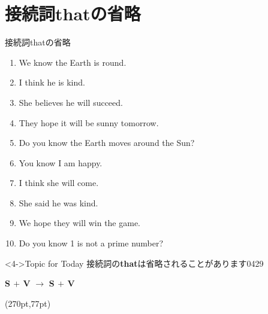 \documentclass[aspectratio=169,xcolor={dvipsnames,table}]{beamer}
\begin{document}
\section{接続詞thatの省略}
\begin{frame}[plain,t]{接続詞thatの省略}
 
\begin{enumerate}
 \item We know \only<1>{\textbf{that}} the Earth is round.
 \item I think  he is kind.
 \item She believes  he will succeed.
 \item They hope  it will be sunny tomorrow.
 \item Do you know  the Earth moves around the Sun?
 \item You know \only<1>{\textbf{that}} I am happy.
 \item I think  she will come.
 \item She said  he was kind.
 \item We hope  they will win the game.
 \item Do you know  1 is not a prime number?
\end{enumerate}

\begin{block}<4->{Topic for Today}\small
 接続詞の\textbf{that}は省略されることがあります\mbox{}\hfill{\tiny 0429}\,{\scriptsize {}}

\hspace{120pt}\textbf{S $+$ V}  $\longrightarrow$ \textbf{S $+$ V} 

\begin{textblock*}{0.4\linewidth}(270pt,77pt)
\end{textblock*}

\end{block}
\end{frame}
\end{document}
